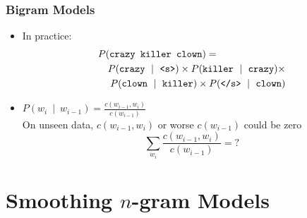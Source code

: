 \begin{frame}
\frametitle{Bigram Models}
\begin{itemize}[<+->]
\item
In practice: 
\begin{eqnarray*}
\lefteqn{P(\texttt{crazy killer clown})=}\\
&& P(\texttt{crazy}~\mid~\texttt{<s>}) \times P(\texttt{killer}~\mid~\texttt{crazy}) \times \\
&& P(\texttt{clown}~\mid~\texttt{killer}) \times P(\texttt{</s>}~\mid~\texttt{clown})
\end{eqnarray*}

\item $P(w_i~\mid~w_{i-1}) = \frac{ c(w_{i-1},w_i) } { c(w_{i-1}) }$ \\
 On unseen data, $c(w_{i-1},w_i)$ or worse $c(w_{i-1})$ could be zero
\[ \sum_{w_i} \frac{ c(w_{i-1},w_i) } { c(w_{i-1}) } = ? \]

\end{itemize}
\end{frame}

\section{Smoothing $n$-gram Models}
\frame{\tableofcontents[currentsection]}


